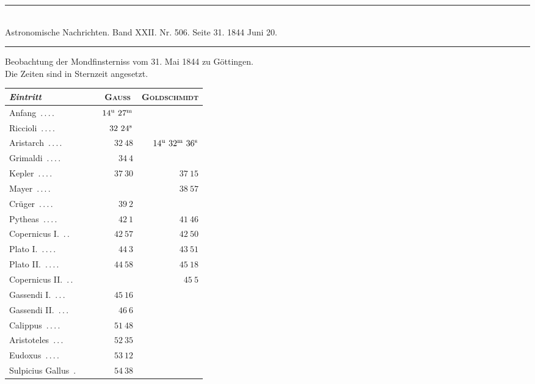 \clearpage
{}
\begin{center}
\rule{0.55\linewidth}{0.4pt}\\[2pt]
Astronomische Nachrichten. Band XXII. Nr. 506. Seite 31. 1844 Juni 20.\\[2pt]
\rule{0.55\linewidth}{0.4pt}
\end{center}
\begin{center}
Beobachtung der Mondfinsterniss vom 31. Mai 1844 zu Göttingen.\\
Die Zeiten sind in Sternzeit angesetzt.
\end{center}

\begin{center}\begingroup\fontsize{10}{12}\selectfont\setlength{\tabcolsep}{5pt}
\begin{tabular}{@{}p{0.47\linewidth}|r|r@{}}
\emph{Eintritt} & \multicolumn{1}{c|}{\textsc{Gauss}} & \multicolumn{1}{c}{\textsc{Goldschmidt}}\\\hline
Anfang\ \mbox{.\,.\,.\,.} & $14^{\rm u}\ 27^{\rm m}$ & \\
Riccioli\ \mbox{.\,.\,.\,.} & $32\ 24^{\rm s}$ & \\
Aristarch\ \mbox{.\,.\,.\,.} & $32\ 48$ & $14^{\rm u}\ 32^{\rm m}\ 36^{\rm s}$\\
Grimaldi\ \mbox{.\,.\,.\,.} & $34\ 4$ & \\
Kepler\ \mbox{.\,.\,.\,.} & $37\ 30$ & $37\ 15$\\
Mayer\ \mbox{.\,.\,.\,.} &  & $38\ 57$\\
Crüger\ \mbox{.\,.\,.\,.} & $39\ 2$ & \\
Pytheas\ \mbox{.\,.\,.\,.} & $42\ 1$ & $41\ 46$\\
Copernicus I.\ \mbox{.\,.} & $42\ 57$ & $42\ 50$\\
Plato I.\ \mbox{.\,.\,.\,.} & $44\ 3$ & $43\ 51$\\
Plato II.\ \mbox{.\,.\,.\,.} & $44\ 58$ & $45\ 18$\\
Copernicus II.\ \mbox{.\,.} &  & $45\ 5$\\
Gassendi I.\ \mbox{.\,.\,.} & $45\ 16$ & \\
Gassendi II.\ \mbox{.\,.\,.} & $46\ 6$ & \\
Calippus\ \mbox{.\,.\,.\,.} & $51\ 48$ & \\
Aristoteles\ \mbox{.\,.\,.} & $52\ 35$ & \\
Eudoxus\ \mbox{.\,.\,.\,.} & $53\ 12$ & \\
Sulpicius Gallus\ \mbox{.} & $54\ 38$ & \\

\end{tabular}
\end{center}
